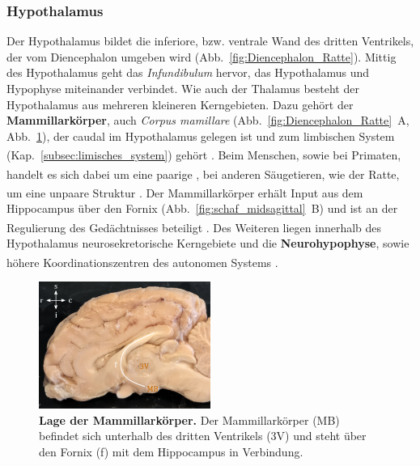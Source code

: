 \subsubsection{Hypothalamus}
\label{subsubsec:Hypothalamus} 

Der Hypothalamus bildet die inferiore, bzw. ventrale Wand des dritten Ventrikels, der vom Diencephalon umgeben wird (Abb.~\ref{fig:Diencephalon_Ratte}). Mittig des Hypothalamus geht das \textit{Infundibulum} hervor, das Hypothalamus und Hypophyse miteinander verbindet. Wie auch der Thalamus besteht der Hypothalamus aus mehreren kleineren Kerngebieten. Dazu gehört der \textbf{Mammillarkörper}, auch \textit{Corpus mamillare} (Abb.~\ref{fig:Diencephalon_Ratte}~A, Abb.~\ref{fig:schaf_MB}), der caudal im Hypothalamus gelegen ist und zum limbischen System (Kap.~\ref{subsec:limisches_system}) gehört \textsuperscript{\cite[Kap.~16]{crossman2014neuroanatomy}}. Beim Menschen, sowie bei Primaten, handelt es sich dabei um eine paarige \textsuperscript{\cite[Kap.~7]{crossman2014neuroanatomy}}, bei anderen Säugetieren, wie der Ratte, um eine unpaare Struktur \textsuperscript{\cite[Kap.~13]{paxinos2014rat}}. Der Mammillarkörper erhält Input aus dem Hippocampus über den Fornix (Abb.~\ref{fig:schaf_midsagittal}~B) und ist an der Regulierung des Gedächtnisses beteiligt \textsuperscript{\cite[Kap.~7]{neurowissenschaften_baer}}. Des Weiteren liegen innerhalb des Hypothalamus neurosekretorische Kerngebiete und die \textbf{Neurohypophyse}, sowie höhere Koordinationszentren des autonomen Systems \textsuperscript{\cite[Kap.~6]{storch2012lehrbuchzoo}}.

\begin{figure}[H]
    \centering
    \includegraphics[width=0.5\textwidth]{pictures/Bilder_Jule/Schaf/Ausschnitte/MB.png}
    \caption[Lage der Mammillarkörper]{\textbf{Lage der Mammillarkörper.} Der Mammillarkörper (MB) befindet sich unterhalb des dritten Ventrikels (3V) und steht über den Fornix (f) mit dem Hippocampus in Verbindung.}
    \label{fig:schaf_MB}
\end{figure}{}


